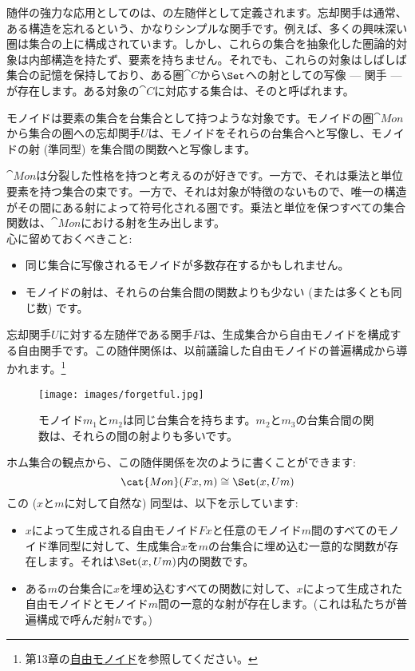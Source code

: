 
\lettrine[lhang=0.17]{随}{伴}の強力な応用としてのは、の左随伴として定義されます。忘却関手は通常、ある構造を忘れるという、かなりシンプルな関手です。例えば、多くの興味深い圏は集合の上に構成されています。しかし、これらの集合を抽象化した圏論的対象は内部構造を持たず、要素を持ちません。それでも、これらの対象はしばしば集合の記憶を保持しており、ある圏$\cat{C}$から$\Set$への射としての写像 --- 関手 --- が存在します。ある対象の$\cat{C}$に対応する集合は、そのと呼ばれます。

モノイドは要素の集合を台集合として持つような対象です。モノイドの圏$\cat{Mon}$から集合の圏への忘却関手$U$は、モノイドをそれらの台集合へと写像し、モノイドの射 (準同型) を集合間の関数へと写像します。

$\cat{Mon}$は分裂した性格を持つと考えるのが好きです。一方で、それは乗法と単位要素を持つ集合の束です。一方で、それは対象が特徴のないもので、唯一の構造がその間にある射によって符号化される圏です。乗法と単位を保つすべての集合関数は、$\cat{Mon}$における射を生み出します。\\
\newline
心に留めておくべきこと:

\begin{itemize}
  \tightlist
  \item
        同じ集合に写像されるモノイドが多数存在するかもしれません。
  \item
        モノイドの射は、それらの台集合間の関数よりも少ない (または多くとも同じ数) です。
\end{itemize}

\noindent
忘却関手$U$に対する左随伴である関手$F$は、生成集合から自由モノイドを構成する自由関手です。この随伴関係は、以前議論した自由モノイドの普遍構成から導かれます。\footnote{第13章の\hyperref[free-monoids]{自由モノイド}を参照してください。}

\begin{figure}[H]
  \centering
  \texttt{[image: images/forgetful.jpg]}
  \caption{モノイド$m_1$と$m_2$は同じ台集合を持ちます。$m_2$と$m_3$の台集合間の関数は、それらの間の射よりも多いです。}
\end{figure}

\noindent
ホム集合の観点から、この随伴関係を次のように書くことができます:
\[\cat{Mon}(F x, m) \cong \Set(x, U m)\]
この ($x$と$m$に対して自然な) 同型は、以下を示しています:

\begin{itemize}
  \tightlist
  \item
        $x$によって生成される自由モノイド$F x$と任意のモノイド$m$間のすべてのモノイド準同型に対して、生成集合$x$を$m$の台集合に埋め込む一意的な関数が存在します。それは$\Set(x, U m)$内の関数です。
  \item
        ある$m$の台集合に$x$を埋め込むすべての関数に対して、$x$によって生成された自由モノイドとモノイド$m$間の一意的な射が存在します。(これは私たちが普遍構成で呼んだ射$h$です。) 
\end{itemize}

